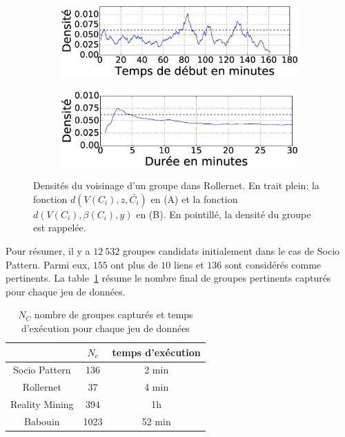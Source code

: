 \begin{figure}
\centering
\begin{subfigure}{0.45\linewidth}
	\includegraphics[width=\linewidth]{img/GroupeDense/GroupExample/Rollernet/vairable_start7}
	\caption{}
	\label{fig:g7_debut}
\end{subfigure}
\begin{subfigure}{0.45\linewidth}
	\includegraphics[width=\linewidth]{img/GroupeDense/GroupExample/Rollernet/vairable_duration7}
	\caption{}
	\label{fig:g7_duree}
\end{subfigure}
\caption{
Densités du voisinage d'un groupe dans Rollernet.
En trait plein: la fonction $d(V(C_i),z,\bar{C_i})$ en (A) et la fonction $d(V(C_i),\beta(C_i),y)$ en (B).
En pointillé, la densité du groupe est rappelée.
}
\label{fig:Rollernet_exemple}
\end{figure}





\bigskip
Pour résumer, il y a $12\ 532$ groupes candidats initialement dans le cas de Socio Pattern.
Parmi eux, $155$ ont plus de $10$ liens et $136$ sont considérés comme pertinents.
La table~\ref{tab:res_exec} résume le nombre final de groupes pertinents capturés pour chaque jeu de données.


\begin{table}
\centering
\begin{tabular}{|c|c|c|}
\hline \rule[-1ex]{0pt}{3.5ex}
 & $N_c$ & temps d'exécution\\
\hline
Socio Pattern & 136 & 2 min\\
Rollernet& 37 & 4 min\\
Reality Mining & 394 & 1h\\
Babouin & 1023 & 52 min\\
\hline
\end{tabular}
\caption{$N_C$ nombre de groupes capturés et temps d'exécution pour chaque jeu de données}
\label{tab:res_exec}       %
\end{table}


